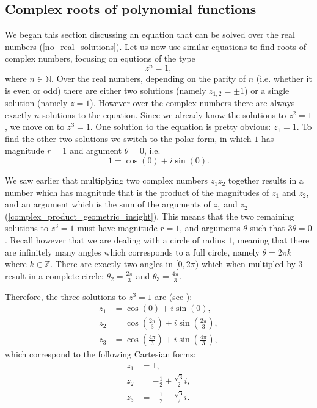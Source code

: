 \subsection{Complex roots of polynomial functions}
We began this section discussing an equation that can be solved over the real numbers (\eqref{no_real_solutions}). Let us now use similar equations to find roots of complex numbers, focusing on equtions of the type
\begin{equation}
	z^{n}=1,
	\label{eq:power equation complex}
\end{equation}
where $n\in\mathbb{N}$. Over the real numbers, depending on the parity of $n$ (i.e. whether it is even or odd) there are either two solutions (namely $z_{1,2}=\pm1$) or a single solution (namely $z=1$). However over the complex numbers there are always exactly $n$ solutions to the equation. Since we already know the solutions to $z^{2}=1$, we move on to $z^{3}=1$. One solution to the equation is pretty obvious: $z_{1}=1$. To find the other two solutions we switch to the polar form, in which $1$ has magnitude $r=1$ and argument $\theta=0$, i.e.
\begin{equation}
	1 = \cos(0) + i\sin(0).
	\label{eq:bla}
\end{equation}

We saw earlier that multiplying two complex numbers $z_{1}z_{2}$ together results in a number which has magnitude that is the product of the magnitudes of $z_{1}$ and $z_{2}$, and an argument which is the sum of the arguments of $z_{1}$ and $z_{2}$ (\eqref{complex_product_geometric_insight}). This means that the two remaining solutions to $z^{3}=1$ must have magnitude $r=1$, and arguments $\theta$ such that $3\theta=0$. Recall however that we are dealing with a circle of radius $1$, meaning that there are infinitely many angles which corresponds to a full circle, namely $\theta=2\pi k$ where $k\in\mathbb{Z}$. There are exactly two angles in $[0,2\pi)$ which when multipled by $3$ result in a complete circle: $\theta_{2}=\frac{2\pi}{3}$ and $\theta_{3}=\frac{4\pi}{3}$.

Therefore, the three solutions to $z^{3}=1$ are (see ):
\begin{align}
	z_{1} &= \cos(0) + i\sin(0),\nonumber\\
	z_{2} &= \cos\left( \frac{2\pi}{3} \right) + i\sin\left( \frac{2\pi}{3} \right),\nonumber\\
	z_{3} &= \cos\left( \frac{4\pi}{3} \right) + i\sin\left( \frac{4\pi}{3} \right),
	\label{eq:third-roots of 1, polar form}
\end{align}
which correspond to the following Cartesian forms:
\begin{align}
	z_{1} &= 1,\nonumber\\
	z_{2} &= -\frac{1}{2}+\frac{\sqrt{3}}{2}i,\nonumber\\
	z_{3} &= -\frac{1}{2}-\frac{\sqrt{3}}{2}i.
	\label{eq:third-roots of 1, Cartesian form}
\end{align}

